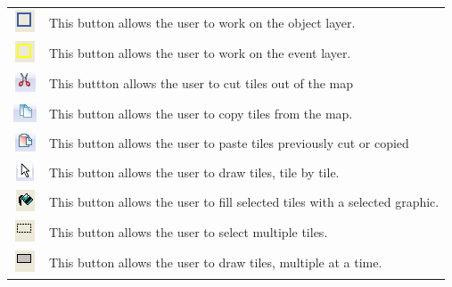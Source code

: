 \begin{table}[]
\begin{tabular}{| c | p{12cm} |}
\includegraphics*{Figures/objectlayer.png} & This button allows the user to work on the object 																						 														layer. \\	[1.0ex]
\includegraphics*{Figures/eventlayer.png} & This button allows the user to work on the event 																																					layer. \\	[1.0ex]
\includegraphics*{Figures/cut.png} & This buttton allows the user to cut tiles out of the map \\	[1.0ex]
\includegraphics*{Figures/copy.png} & This button allows the user to copy tiles from the map. \\	[1.0ex]
\includegraphics*{Figures/paste.png} & This button allows the user to paste tiles previously cut or copied\\	[1.0ex]
\includegraphics*{Figures/pointer.png} & This button allows the user to draw tiles, tile by tile. \\ [1.0ex]
\includegraphics*{Figures/fill.png} & This button allows the user to fill selected tiles with a 																																			selected graphic. \\	[1.0ex]
\includegraphics*{Figures/selectgrp.png} & This button allows the user to select multiple tiles. 																				 															\\	[1.0ex]
\includegraphics*{Figures/fillgrp.png} & This button allows the user to draw tiles, multiple at a time. \\																				 																[1.0ex]

\end{tabular}
\end{table}
